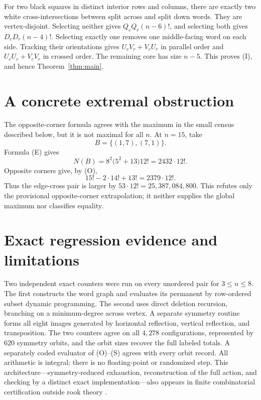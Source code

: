 \documentclass[11pt]{article}
\begin{document}
For two black squares in distinct interior rows and columns, there are exactly
two white cross-intersections between split across and split down words.  They
are vertex-disjoint.  Selecting neither gives $Q_cQ_r(n-6)!$, and selecting
both gives $D_cD_r(n-4)!$.  Selecting exactly one removes one middle-facing
word on each side.  Tracking their orientations gives $U_cV_r+V_cU_r$ in
parallel order and $U_cU_r+V_cV_r$ in crossed order.  The remaining core has
size $n-5$.  This proves (I), and hence Theorem~\ref{thm:main}.

\section{A concrete extremal obstruction}

The opposite-corner formula agrees with the maximum in the small census
described below, but it is not maximal for all $n$.  At $n=15$, take
\[
       B=\{(1,7),(7,1)\}.
\]
Formula (E) gives
\[
 N(B)=8^2\bigl(5^2+13\bigr)12!=2432\cdot12!.
\]
Opposite corners give, by (O),
\[
 15!-2\cdot14!+13!=2379\cdot12!.
\]
Thus the edge-cross pair is larger by
$53\cdot12!=25{,}387{,}084{,}800$.  This refutes only the provisional
opposite-corner extrapolation; it neither supplies the global maximum nor
classifies equality.

\section{Exact regression evidence and limitations}

Two independent exact counters were run on every unordered pair for
$3\leq n\leq8$.  The first constructs the word graph and evaluates its
permanent by row-ordered subset dynamic programming.  The second uses direct
deletion recursion, branching on a minimum-degree across vertex.  A separate
symmetry routine forms all eight images generated by horizontal reflection,
vertical reflection, and transposition.  The two counters agree on all
$4{,}278$ configurations, represented by $620$ symmetry orbits, and the orbit
sizes recover the full labeled totals.  A separately coded evaluator of
(O)--(S) agrees with every orbit record.  All arithmetic is integral; there is
no floating-point or randomized step.  This architecture---symmetry-reduced
exhaustion, reconstruction of the full action, and checking by a distinct
exact implementation---also appears in finite combinatorial certification
outside rook theory \cite[Sections~3, 4, and 6]{202608.1658}.
\end{document}
